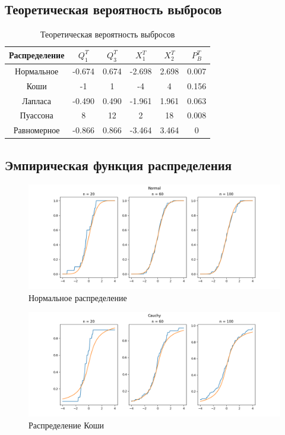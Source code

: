 \documentclass[12pt]{article}
\begin{document}
\subsection{Теоретическая вероятность выбросов}
\begin{table}[h!]
  \centering
  \begin{adjustbox}{width=0.5\textwidth}
    \begin{tabular}{| c | c | c | c | c | c |}
      \hline
      Распределение & $Q^T_1$ & $Q^T_3$ & $X^T_1$ & $X^T_2$ & $P^T_B$ \\\hline
      Нормальное & -0.674 & 0.674 & -2.698 & 2.698 & 0.007 \\\hline
      Коши & -1 & 1 & -4 & 4 & 0.156 \\\hline
      Лапласа & -0.490 & 0.490 & -1.961 & 1.961 & 0.063 \\\hline
      Пуассона & 8 & 12 & 2 & 18 & 0.008 \\\hline
      Равномерное & -0.866 & 0.866 & -3.464 & 3.464 & 0 \\\hline
      
    \end{tabular}
  \end{adjustbox}
  \caption{Теоретическая вероятность выбросов}
\end{table}

\FloatBarrier
\subsection{Эмпирическая функция распределения}

\begin{figure}[h!]
  \centering
  \includegraphics[width=0.8\paperwidth ]{images/edf/Normal.png}
  \caption{Нормальное распределение}
\end{figure}

\begin{figure}[h!]
  \centering
  \includegraphics[width=0.8\paperwidth ]{images/edf/Cauchy.png}
  \caption{Распределение Коши}
\end{figure}
\end{document}
